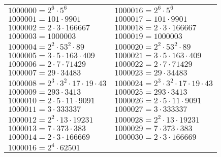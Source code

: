 \begin{tabular}{ll}
    \centering
    $1000000=2^{6} \cdot 5^{6}$ & $1000016=2^{6} \cdot 5^{6}$ \\
    $1000001=101 \cdot 9901$ & $1000017=101 \cdot 9901$ \\
    $1000002=2 \cdot 3 \cdot 166667$ & $1000018=2 \cdot 3 \cdot 166667$ \\
    $1000003=1000003$ & $1000019=1000003$ \\
    $1000004=2^{2} \cdot 53^{2} \cdot 89$ & $1000020=2^{2} \cdot 53^{2} \cdot 89$ \\
    $1000005=3 \cdot 5 \cdot 163 \cdot 409$ & $1000021=3 \cdot 5 \cdot 163 \cdot 409$ \\
    $1000006=2 \cdot 7 \cdot 71429$ & $1000022=2 \cdot 7 \cdot 71429$ \\
    $1000007=29 \cdot 34483$ & $1000023=29 \cdot 34483$ \\
    $1000008=2^{3} \cdot 3^{2} \cdot 17 \cdot 19 \cdot 43$ & $1000024=2^{3} \cdot 3^{2} \cdot 17 \cdot 19 \cdot 43$ \\
    $1000009=293 \cdot 3413$ & $1000025=293 \cdot 3413$ \\
    $1000010=2 \cdot 5 \cdot 11 \cdot 9091$ & $1000026=2 \cdot 5 \cdot 11 \cdot 9091$ \\
    $1000011=3 \cdot 333337$ & $1000027=3 \cdot 333337$ \\
    $1000012=2^{2} \cdot 13 \cdot 19231$ & $1000028=2^{2} \cdot 13 \cdot 19231$ \\
    $1000013=7 \cdot 373 \cdot 383$ & $1000029=7 \cdot 373 \cdot 383$ \\
    $1000014=2 \cdot 3 \cdot 166669$ & $1000030=2 \cdot 3 \cdot 166669$ \\
    $1000016=2^{4} \cdot 62501$ & \\
    \end{tabular}